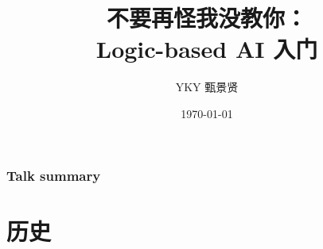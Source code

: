 \documentclass[15pt]{beamer}
\title[AI logic tutorial]{{\normalsize 不要再怪我没教你：}\\ \Huge Logic-based AI 入门}
\author{YKY 甄景贤} %
\institute[] %
{
Independent researcher, Hong Kong \\ %
\medskip
\textit{generic.intelligence@gmail.com} %
}
\date{\today} %
\begin{document}
\frame{\titlepage}

\begin{frame}
\frametitle{Talk summary}
\tableofcontents
\end{frame}

%
%





\section[Section]{历史}
\frame{\sectionpage}
\end{document}
